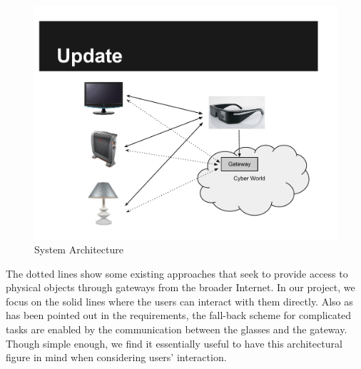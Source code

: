 \begin{figure}
  \centering
  \includegraphics[width=\linewidth]{../figs/sysarch.pdf}
  \caption{System Architecture}
  \label{fig:sysarch}
\end{figure}

The dotted lines show some existing approaches that seek to provide access to physical objects through gateways from the broader Internet. In our project, we focus on the solid lines where the users can interact with them directly. Also as has been pointed out in the requirements, the fall-back scheme for complicated tasks are enabled by the communication between the glasses and the gateway. Though simple enough, we find it essentially useful to have this architectural figure in mind when considering users' interaction.





